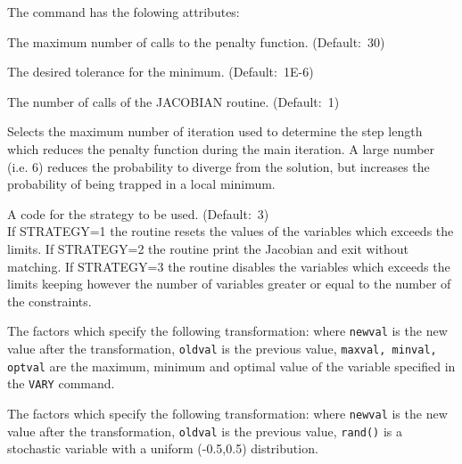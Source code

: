 The command has the folowing attributes: 
\begin{madlist}
   The maximum number of calls to the penalty
  function. (Default:~30)  

   The desired tolerance for the minimum. 
  (Default:~1E-6)

   The number of calls of the JACOBIAN routine. 
  (Default:~1) 

   Selects the maximum number of iteration used to
  determine the step length which reduces the penalty function during
  the main iteration. A large number (i.e. 6) reduces the probability
  to diverge from the solution, but increases the probability of being
  trapped in a local minimum.  

   A code for the strategy to be used. (Default:~3)\\
  If STRATEGY=1 the routine resets the values of the variables which
  exceeds the limits. If STRATEGY=2 the routine print the Jacobian
  and exit without matching. If STRATEGY=3 the routine  disables the
  variables which exceeds the limits keeping however the number of
  variables greater or equal to the number of the constraints.  

   The factors which specify the following
  transformation: 
  where \texttt{newval} is the new value after the transformation,
  \texttt{oldval} is the previous value, \texttt{maxval, minval,
    optval} are the maximum, minimum and optimal value of
   the variable specified in the \texttt{VARY} command. 

    The factors which specify the following transformation:
   where \texttt{newval} is the new value after the transformation,
   \texttt{oldval} is the previous value, \texttt{rand()} is a stochastic
   variable with a uniform (-0.5,0.5) distribution.   
\end{madlist} 




